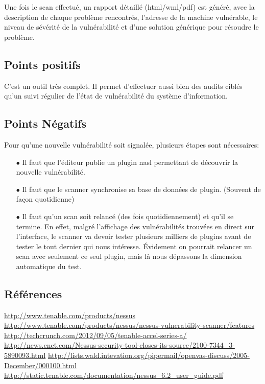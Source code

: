 Une fois le scan effectué, un rapport détaillé (html/wml/pdf) est généré, avec la description de chaque problème rencontrés, l’adresse de la machine vulnérable, le niveau de sévérité de la vulnérabilité et d’une solution générique pour résoudre le problème.


\subsection{Points positifs}
C’est un outil très complet. Il permet d'effectuer aussi bien des audits ciblés qu’un suivi régulier de l’état de vulnérabilité du système d’information.

\subsection{Points Négatifs}
Pour qu’une nouvelle vulnérabilité soit signalée, plusieurs étapes sont nécessaires:\\
\begin{itemize}
\item [$\bullet$]Il faut que l’éditeur publie un plugin nasl permettant de découvrir la nouvelle vulnérabilité.\\
\item [$\bullet$]Il faut que le scanner synchronise sa base de données de plugin. (Souvent de façon quotidienne)\\
\item [$\bullet$]Il faut qu’un scan soit relancé (des fois quotidiennement) et qu’il se termine. En effet, malgré l’affichage des vulnérabilités trouvées en direct sur l’interface, le scanner va devoir tester plusieurs milliers de plugins avant de tester le tout dernier qui nous intéresse. Évidement on pourrait relancer un scan avec seulement ce seul plugin, mais là nous dépassons la dimension automatique du test.
\end{itemize}

\subsection{Références}
\small
\noindent
 [1] \url{http://www.tenable.com/products/nessus} \newline
 [2] \url{http://www.tenable.com/products/nessus/nessus-vulnerability-scanner/features} \newline
 [3] \url{http://techcrunch.com/2012/09/05/tenable-accel-series-a/} \newline
 [3] \url{http://news.cnet.com/Nessus-security-tool-closes-its-source/2100-7344_3-5890093.html} \newline
 [5] \url{http://lists.wald.intevation.org/pipermail/openvas-discuss/2005-December/000100.html} \newline
 [6] \url{http://static.tenable.com/documentation/nessus_6.2_user_guide.pdf} \newline
\normalsize